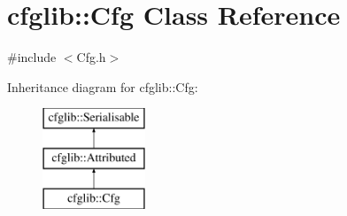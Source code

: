 \hypertarget{classcfglib_1_1Cfg}{}\section{cfglib\+:\+:Cfg Class Reference}
\label{classcfglib_1_1Cfg}


{\ttfamily \#include $<$Cfg.\+h$>$}

Inheritance diagram for cfglib\+:\+:Cfg\+:\begin{figure}[H]
\begin{center}
\leavevmode
\includegraphics[height=3.000000cm]{classcfglib_1_1Cfg}
\end{center}
\end{figure}
